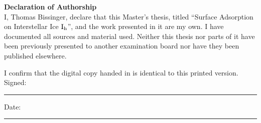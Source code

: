 
\begin{center}
\begin{minipage}{.8\textwidth}
{\Huge\textbf{Declaration of Authorship}\\[20pt]}
\Large\noindent I, Thomas Bissinger, declare that this Master's thesis, titled
``Surface Adsorption on Interstellar Ice $\text I_\text h$'', and the
work presented in it are my own. I have documented all sources and material
used. Neither this thesis nor parts of it have been previously presented to
another examination board nor have they been published elsewhere.

I confirm that the digital copy handed in is identical to this printed
version.\\[10pt]
 
\noindent Signed:\\
\rule[0.5em]{25em}{0.5pt} %
 
\noindent Date:\\
\rule[0.5em]{25em}{0.5pt} %
\end{minipage}
\end{center}
\cleardoublepage

